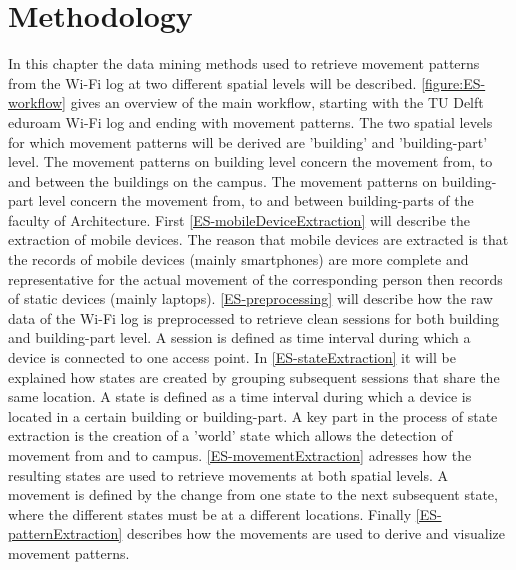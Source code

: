 \section{Methodology}\label{2-methodology}
In this chapter the data mining methods used to retrieve movement patterns from the Wi-Fi log at two different spatial levels will be described. \autoref{figure:ES-workflow} gives an overview of the main workflow, starting with the TU Delft eduroam Wi-Fi log and ending with movement patterns. The two spatial levels for which movement patterns will be derived are 'building' and 'building-part' level. The movement patterns on building level concern the movement from, to and between the buildings on the campus. The movement patterns on building-part level concern the movement from, to and between building-parts of the faculty of Architecture. First \autoref{ES-mobileDeviceExtraction} will describe the extraction of mobile devices. The reason that mobile devices are extracted is that the records of mobile devices (mainly smartphones) are more complete and representative for the actual movement of the corresponding person then records of static devices (mainly laptops). \autoref{ES-preprocessing} will describe how the raw data of the Wi-Fi log is preprocessed to retrieve clean sessions for both building and building-part level. A session is defined as time interval during which a device is connected to one access point. In \autoref{ES-stateExtraction} it will be explained how states are created by grouping subsequent sessions that share the same location. A state is defined as a time interval during which a device is located in a certain building or building-part. A key part in the process of state extraction is the creation of a 'world' state which allows the detection of movement from and to campus. \autoref{ES-movementExtraction} adresses how the resulting states are used to retrieve movements at both spatial levels. A movement is defined by the change from one state to the next subsequent state, where the different states must be at a different locations. Finally \autoref{ES-patternExtraction} describes how the movements are used to derive and visualize movement patterns.
